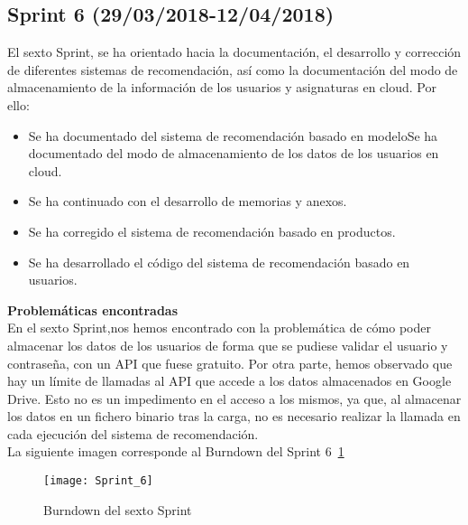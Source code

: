 \subsection{\textbf{Sprint 6} (29/03/2018-12/04/2018) }
El sexto  Sprint, se ha orientado hacia la documentación, el desarrollo  y corrección de  diferentes sistemas de recomendación, así como la documentación del modo de almacenamiento de la información de los usuarios y asignaturas en cloud.  
Por ello: 
\begin{itemize}
\item Se ha documentado del sistema de recomendación basado en modeloSe ha documentado del modo de almacenamiento de los datos de los usuarios en cloud. 
\item Se ha continuado con el desarrollo de memorias y anexos. 
\item Se ha corregido el sistema de recomendación basado en productos. 
\item Se ha desarrollado el código del sistema de recomendación basado en usuarios.  

\end{itemize}
\textbf{Problemáticas encontradas}\\En el sexto Sprint,nos hemos encontrado con la problemática de cómo poder almacenar los datos de los usuarios de forma que se pudiese validar el usuario y contraseña, con un API que fuese gratuito. Por otra parte, hemos observado que hay un límite de llamadas al API que accede a  los datos almacenados en Google Drive. Esto no es un impedimento en el acceso a los mismos, ya que, al almacenar los datos en un fichero binario tras la carga, no es necesario realizar la llamada en cada ejecución del sistema de recomendación. 
 \\La siguiente imagen corresponde al Burndown del Sprint 6~\ref{fig:A.2.6}
\begin{figure}[h]
\centering
\texttt{[image: Sprint\_6]}
\caption{Burndown del sexto Sprint}
\label{fig:A.2.6}
\end{figure}
\\



